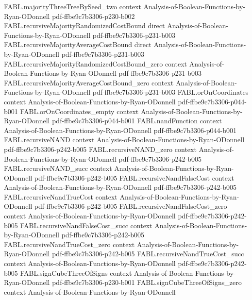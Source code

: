 \begin{theorem}
\proofstep
  {FABL.majorityThreeTreeBySeed_two}
  {context}
  {Analysis-of-Boolean-Functions-by-Ryan-ODonnell}
  {pdf-ffbe9c7b3306-p230-b002}
\proofstep
  {FABL.recursiveMajorityRandomizedCostBound}
  {direct}
  {Analysis-of-Boolean-Functions-by-Ryan-ODonnell}
  {pdf-ffbe9c7b3306-p231-b003}
\proofstep
  {FABL.recursiveMajorityAverageCostBound}
  {direct}
  {Analysis-of-Boolean-Functions-by-Ryan-ODonnell}
  {pdf-ffbe9c7b3306-p231-b003}
\proofstep
  {FABL.recursiveMajorityRandomizedCostBound_zero}
  {context}
  {Analysis-of-Boolean-Functions-by-Ryan-ODonnell}
  {pdf-ffbe9c7b3306-p231-b003}
\proofstep
  {FABL.recursiveMajorityAverageCostBound_zero}
  {context}
  {Analysis-of-Boolean-Functions-by-Ryan-ODonnell}
  {pdf-ffbe9c7b3306-p231-b003}
\proofstep
  {FABL.orOnCoordinates}
  {context}
  {Analysis-of-Boolean-Functions-by-Ryan-ODonnell}
  {pdf-ffbe9c7b3306-p044-b001}
\proofstep
  {FABL.orOnCoordinates_empty}
  {context}
  {Analysis-of-Boolean-Functions-by-Ryan-ODonnell}
  {pdf-ffbe9c7b3306-p044-b001}
\proofstep
  {FABL.nandFunction}
  {context}
  {Analysis-of-Boolean-Functions-by-Ryan-ODonnell}
  {pdf-ffbe9c7b3306-p044-b001}
\proofstep
  {FABL.recursiveNAND}
  {context}
  {Analysis-of-Boolean-Functions-by-Ryan-ODonnell}
  {pdf-ffbe9c7b3306-p242-b005}
\proofstep
  {FABL.recursiveNAND_zero}
  {context}
  {Analysis-of-Boolean-Functions-by-Ryan-ODonnell}
  {pdf-ffbe9c7b3306-p242-b005}
\proofstep
  {FABL.recursiveNAND_succ}
  {context}
  {Analysis-of-Boolean-Functions-by-Ryan-ODonnell}
  {pdf-ffbe9c7b3306-p242-b005}
\proofstep
  {FABL.recursiveNandFalseCost}
  {context}
  {Analysis-of-Boolean-Functions-by-Ryan-ODonnell}
  {pdf-ffbe9c7b3306-p242-b005}
\proofstep
  {FABL.recursiveNandTrueCost}
  {context}
  {Analysis-of-Boolean-Functions-by-Ryan-ODonnell}
  {pdf-ffbe9c7b3306-p242-b005}
\proofstep
  {FABL.recursiveNandFalseCost_zero}
  {context}
  {Analysis-of-Boolean-Functions-by-Ryan-ODonnell}
  {pdf-ffbe9c7b3306-p242-b005}
\proofstep
  {FABL.recursiveNandFalseCost_succ}
  {context}
  {Analysis-of-Boolean-Functions-by-Ryan-ODonnell}
  {pdf-ffbe9c7b3306-p242-b005}
\proofstep
  {FABL.recursiveNandTrueCost_zero}
  {context}
  {Analysis-of-Boolean-Functions-by-Ryan-ODonnell}
  {pdf-ffbe9c7b3306-p242-b005}
\proofstep
  {FABL.recursiveNandTrueCost_succ}
  {context}
  {Analysis-of-Boolean-Functions-by-Ryan-ODonnell}
  {pdf-ffbe9c7b3306-p242-b005}
\proofstep
  {FABL.signCubeThreeOfSigns}
  {context}
  {Analysis-of-Boolean-Functions-by-Ryan-ODonnell}
  {pdf-ffbe9c7b3306-p230-b001}
\proofstep
  {FABL.signCubeThreeOfSigns_zero}
  {context}
  {Analysis-of-Boolean-Functions-by-Ryan-ODonnell}

\end{theorem}
